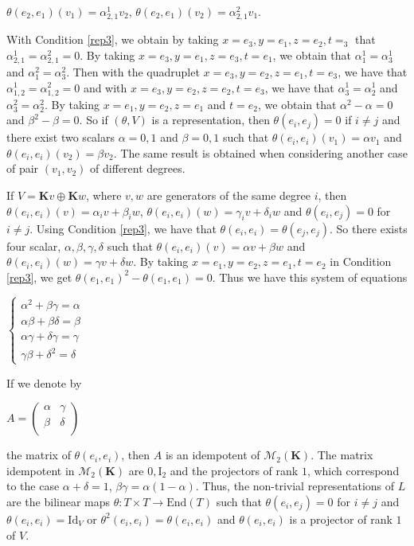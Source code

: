 \documentclass[11pt, twoside]{article}
\begin{document}
\begin{ex}
\begin{center}
        $ \theta(e_2,e_1)(v_1)= \alpha_{2,1}^1v_2 $, $\theta(e_2,e_1)(v_2)= \alpha_{2,1}^2v_1 $. 
    \end{center} With  Condition \eqref{rep3}, we obtain by taking $x=e_3,y=e_1 ,z=e_2 ,t=_3 $ that $\alpha_{2,1}^1=\alpha_{2,1}^2=0 $. By taking $x=e_3,y=e_1,z=e_3,t=e_1 $, we obtain that $\alpha_{1}^1=\alpha_3^1 $ and $\alpha_1^2=\alpha_3^2 $. Then with the quadruplet $x=e_3,y=e_2,z=e_1, t=e_3 $, we have that $\alpha_{1,2}^1=\alpha_{1,2}^2= 0 $ and with $x=e_3,y=e_2,z=e_2,t=e_3 $, we have that $\alpha_{3}^1=\alpha_2^1 $ and $\alpha_3^2=\alpha_2^2 $. By taking $x=e_1,y=e_2,z=e_1$ and $t=e_2$, we obtain that $\alpha^2-\alpha=0 $ and $\beta^2-\beta=0 $. So if $(\theta,V)$ is a representation, then $\theta(e_i,e_j)=0 $ if $i\neq j$ and there exist two scalars $\alpha=0,1$ and $\beta=0,1 $ such that $\theta(e_i,e_i)(v_1)=\alpha v_1 $ and $\theta(e_i,e_i)(v_2)=\beta v_2 $. The same result is obtained when considering another case of pair $(v_1,v_2)$ of different degrees.
    
    If $V= \mathbf{K}v\oplus \mathbf{K}w$, where  $v,w$ are generators of the same degree $i$, then $\theta(e_i,e_i)(v)= \alpha_iv+\beta_iw $, $\theta(e_i,e_i)(w)= \gamma_iv+ \delta_iw $ and $\theta(e_i,e_j)=0 $ for $i\neq j$. Using  Condition \eqref{rep3}, we have that $\theta(e_i,e_i)=\theta(e_j,e_j) $. So there exists four scalar, $\alpha,\beta,\gamma,\delta $ such that $\theta(e_i,e_i)(v) = \alpha v+\beta w $ and $\theta(e_i,e_i)(w)= \gamma v+ \delta w $. By taking $x=e_1,y=e_2,z=e_1,t=e_2 $ in Condition \eqref{rep3}, we get $\theta(e_1,e_1)^2-\theta(e_1,e_1)=0. $ Thus we have this system of equations \begin{center}
        $\left\{\begin{matrix}
\alpha^2+\beta\gamma=\alpha \\ \alpha\beta+\beta\delta=\beta
 \\\alpha\gamma+\delta\gamma=\gamma
 \\ \gamma\beta+\delta^2=\delta
\end{matrix}\right.$
   \end{center} If we denote by \begin{center}
        $A=\begin{pmatrix}
\alpha  & \gamma  \\
\beta  & \delta   \\
\end{pmatrix} $
    \end{center} the matrix of $\theta(e_i,e_i) $, then $A$ is an idempotent of $\mathcal{M}_2(\mathbf{K}). $ The matrix idempotent in $\mathcal{M}_2(\mathbf{K}) $ are $0, \mathrm{I}_2$ and the projectors of rank $1$, which correspond to the case $\alpha+\delta=1 $, $\beta\gamma= \alpha(1-\alpha). $ Thus, the non-trivial representations of $L$ are the bilinear maps $\theta:T\times T\to \mathrm{End}(T) $ such that $\theta(e_i,e_j)=0 $ for $i\neq j$ and $\theta(e_i,e_i)=\mathrm{Id}_V $ or $\theta^2
    (e_i,e_i)=\theta(e_i,e_i) $ and $\theta(e_i,e_i) $ is a projector of rank $1$ of $V$. 
\end{ex}
\end{document}
